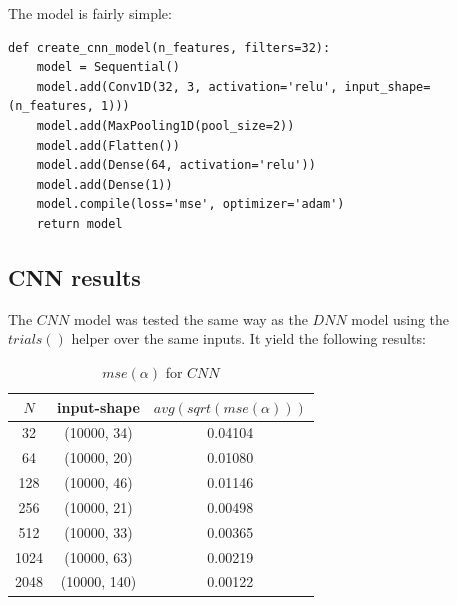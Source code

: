 \documentclass[a4paper, 12pt]{report}
\begin{document}
The model is fairly simple:
\begin{verbatim}
def create_cnn_model(n_features, filters=32):
    model = Sequential()
    model.add(Conv1D(32, 3, activation='relu', input_shape=(n_features, 1)))
    model.add(MaxPooling1D(pool_size=2))
    model.add(Flatten())
    model.add(Dense(64, activation='relu'))
    model.add(Dense(1))
    model.compile(loss='mse', optimizer='adam')
    return model
\end{verbatim}

\subsection{CNN results}
The $CNN$ model was tested the same way as the $DNN$ model using the $trials()$ helper over the same inputs. It yield the following results:

\begin{table}[h!]
    \centering
    \begin{tabular}{||c c c||} 
        \hline
        $N$ & input-shape & $avg(sqrt(mse(\alpha)))$ \\ [0.5ex] 
        \hline\hline
        32 & (10000, 34) & 0.04104 \\ 
        \hline
        64 & (10000, 20) & 0.01080 \\
        \hline
        128 & (10000, 46) & 0.01146 \\
        \hline
        256 & (10000, 21) & 0.00498 \\
        \hline
        512 & (10000, 33) & 0.00365 \\ 
        \hline
        1024 & (10000, 63) & 0.00219 \\ 
        \hline
        2048 & (10000, 140) & 0.00122 \\ 
        \hline
    \end{tabular}
    \caption{$mse(\alpha)$ for $CNN$}
    \label{table:cnn-sqrt-mse}
\end{table}
\end{document}
